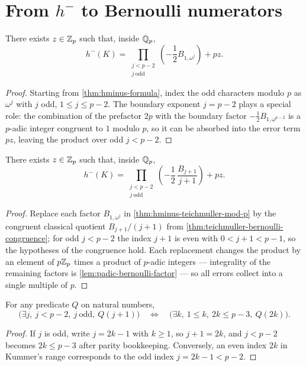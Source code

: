 \section{\texorpdfstring{From $h^-$ to Bernoulli numerators}{From h-minus to Bernoulli numerators}}

\begin{theorem}\label{thm:hminus-teichmuller-mod-p}
  \leanok
There exists $z\in\mathbb{Z}_p$ such that, inside $\mathbb{Q}_p$,
\[
  h^-(K)
  =
  \prod_{\substack{j<p-2\\ j\ \mathrm{odd}}}
    \left(-\frac12 B_{1,\omega^j}\right)
  + pz .
\]
\end{theorem}
\begin{proof}\leanok
Starting from \cref{thm:hminus-formula}, index the odd characters modulo
$p$ as $\omega^j$ with $j$ odd, $1 \le j \le p-2$.  The boundary exponent
$j = p-2$ plays a special role: the combination of the prefactor $2p$ with
the boundary factor $-\tfrac12 B_{1,\omega^{p-2}}$ is a $p$-adic integer
congruent to $1$ modulo $p$, so it can be absorbed into the error term
$pz$, leaving the product over odd $j < p-2$.
\end{proof}

\begin{theorem}\label{thm:hminus-bernoulli-mod-p}
  \leanok
There exists $z\in\mathbb{Z}_p$ such that, inside $\mathbb{Q}_p$,
\[
  h^-(K)
  =
  \prod_{\substack{j<p-2\\ j\ \mathrm{odd}}}
    \left(-\frac12\,\frac{B_{j+1}}{j+1}\right)
  + pz .
\]
\end{theorem}
\begin{proof}\leanok
Replace each factor $B_{1,\omega^j}$ in \cref{thm:hminus-teichmuller-mod-p}
by the congruent classical quotient $B_{j+1}/(j+1)$ from
\cref{thm:teichmuller-bernoulli-congruence}; for odd $j < p-2$ the index
$j+1$ is even with $0 < j+1 < p-1$, so the hypotheses of the congruence
hold.  Each replacement changes the product by an element of $p\mathbb{Z}_p$ times
a product of $p$-adic integers --- integrality of the remaining factors is
\cref{lem:padic-bernoulli-factor} --- so all errors collect into a single
multiple of $p$.
\end{proof}

\begin{lemma}\label{lem:odd-index-to-k}
  \leanok
For any predicate $Q$ on natural numbers,
\[
  \bigl(\exists j,\ j<p-2,\ j\ \mathrm{odd},\ Q(j+1)\bigr)
  \quad\Longleftrightarrow\quad
  \bigl(\exists k,\ 1\le k,\ 2k\le p-3,\ Q(2k)\bigr).
\]
\end{lemma}
\begin{proof}\leanok
If $j$ is odd, write $j=2k-1$ with $k \ge 1$, so $j+1=2k$, and $j < p-2$
becomes $2k \le p-3$ after parity bookkeeping.  Conversely, an even index
$2k$ in Kummer's range corresponds to the odd index $j=2k-1 < p-2$.
\end{proof}

